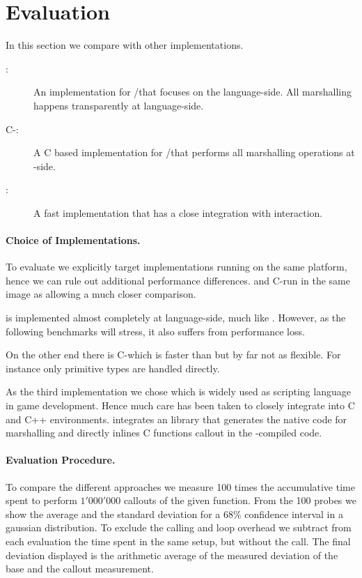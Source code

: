 \section{\NBFFI Evaluation}

In this section we compare \NB with other \FFI implementations.
\begin{description}
	\item[\Alien \FFI:] An \FFI implementation for \Squeak/\PH that focuses on the language-side. All marshalling happens transparently at language-side.
	\item[C-\FFI:] A C based \FFI implementation for \Squeak/\PH that performs all marshalling operations at \VM-side.
	\item[\LuaJIT:] A fast \Lua implementation that has a close \FFI integration with \JIT interaction.
\end{description}

\paragraph{Choice of \FFI Implementations.}
To evaluate \NB we explicitly target \FFI implementations running on the same platform, hence we can rule out additional performance differences.
\Alien and C-\FFI run in the same \PH image as \NB allowing a much closer comparison.

\Alien \FFI is implemented almost completely at language-side, much like \NB.
However, as the following benchmarks will stress, it also suffers from performance loss.

On the other end there is C-\FFI which is faster than \Alien but by far not as flexible.
For instance only primitive types are handled directly.

As the third implementation we chose \Lua which is widely used as scripting language in game development.
Hence much care has been taken to closely integrate \Lua into C and C++ environments.
\LuaJIT integrates an \FFI library that generates the native code for marshalling and directly inlines C functions callout in the \JIT-compiled code.

\paragraph{Evaluation Procedure.}
To compare the different \FFI approaches we measure 100 times the accumulative time spent to perform $1'000'000$ callouts of the given function.
From the 100 probes we show the average and the standard deviation for a $68\%$ confidence interval in a gaussian distribution.
To exclude the calling and loop overhead we subtract from each evaluation the time spent in the same setup, but without the \FFI call.
The final deviation displayed is the arithmetic average of the measured deviation of the base and the callout measurement.


